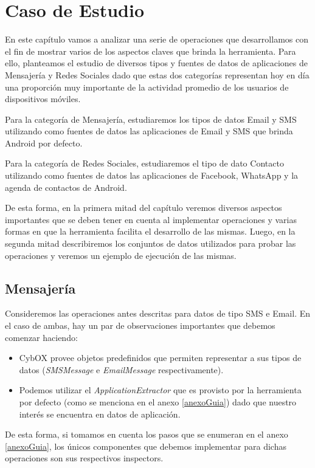 \chapter{Caso de Estudio}
En este capítulo vamos a analizar una serie de operaciones que desarrollamos con el fin de mostrar varios de los aspectos claves que brinda la herramienta. Para ello, planteamos el estudio de diversos tipos y fuentes de datos de aplicaciones de Mensajería y Redes Sociales dado que estas dos categorías representan hoy en día una proporción muy importante de la actividad promedio de los usuarios de dispositivos móviles.

Para la categoría de Mensajería, estudiaremos los tipos de datos Email y SMS utilizando como fuentes de datos las aplicaciones de Email y SMS que brinda Android por defecto.

Para la categoría de Redes Sociales, estudiaremos el tipo de dato Contacto utilizando como fuentes de datos las aplicaciones de Facebook, WhatsApp y la agenda de contactos de Android.

De esta forma, en la primera mitad del capítulo veremos diversos aspectos importantes que se deben tener en cuenta al implementar operaciones y varias formas en que la herramienta facilita el desarrollo de las mismas. Luego, en la segunda mitad describiremos los conjuntos de datos utilizados para probar las operaciones y veremos un ejemplo de ejecución de las mismas.

\section{Mensajería}
Consideremos las operaciones antes descritas para datos de tipo SMS e Email. En el caso de ambas, hay un par de observaciones importantes que debemos comenzar haciendo:
\begin{itemize}
\item CybOX provee objetos predefinidos que permiten representar a sus tipos de datos (\emph{SMSMessage} e \emph{EmailMessage} respectivamente).
\item Podemos utilizar el \emph{ApplicationExtractor} que es provisto por la herramienta por defecto (como se menciona en el anexo \ref{anexoGuia}) dado que nuestro interés se encuentra en datos de aplicación.
\end{itemize}

De esta forma, si tomamos en cuenta los pasos que se enumeran en el anexo \ref{anexoGuia}, los únicos componentes que debemos implementar para dichas operaciones son sus respectivos inspectors.


